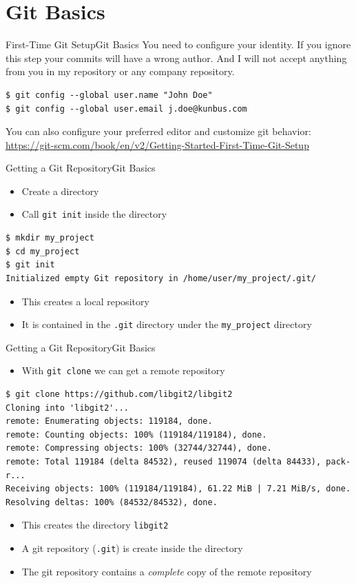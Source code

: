 \documentclass[aspectratio=169]{beamer}
\newcommand{\sectiontitle}{}
\newcommand{\newsection}[1]{\renewcommand{\sectiontitle}{#1}\section{#1}}
\begin{document}
\newsection{Git Basics}
\begin{frame}[fragile]{First-Time Git Setup}{\sectiontitle}
You need to configure your identity. If you ignore this step your commits will
have a wrong author. And I will not accept anything from you in my repository
or any company repository.
\begin{verbatim}
$ git config --global user.name "John Doe"
$ git config --global user.email j.doe@kunbus.com
\end{verbatim}
You can also configure your preferred editor and customize git behavior:
\url{https://git-scm.com/book/en/v2/Getting-Started-First-Time-Git-Setup}
\end{frame}

\begin{frame}[fragile]{Getting a Git Repository}{\sectiontitle}
\begin{itemize}
    \item Create a directory
    \item Call \verb|git init| inside the directory
\end{itemize}
\begin{verbatim}
$ mkdir my_project
$ cd my_project
$ git init
Initialized empty Git repository in /home/user/my_project/.git/
\end{verbatim}
\begin{itemize}
    \item This creates a local repository
    \item It is contained in the \verb|.git| directory under the \verb|my_project| directory
\end{itemize}
\end{frame}

\begin{frame}[fragile]{Getting a Git Repository}{\sectiontitle}
\begin{itemize}
    \item With \verb|git clone| we can get a remote repository
\end{itemize}
\begin{verbatim}
$ git clone https://github.com/libgit2/libgit2
Cloning into 'libgit2'...
remote: Enumerating objects: 119184, done.
remote: Counting objects: 100% (119184/119184), done.
remote: Compressing objects: 100% (32744/32744), done.
remote: Total 119184 (delta 84532), reused 119074 (delta 84433), pack-r...
Receiving objects: 100% (119184/119184), 61.22 MiB | 7.21 MiB/s, done.
Resolving deltas: 100% (84532/84532), done.
\end{verbatim}
\begin{itemize}
    \item This creates the directory \verb|libgit2|
    \item A git repository (\verb|.git|) is create inside the directory
    \item The git repository contains a \emph{complete} copy of the remote repository
\end{itemize}
\end{frame}
\end{document}

